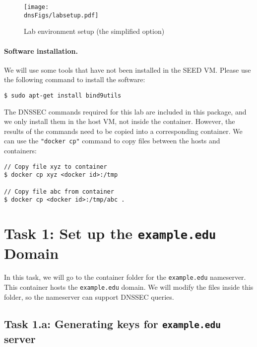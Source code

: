 \begin{figure}[htb]
\begin{center}
\texttt{[image: \\dnsFigs/labsetup.pdf]}
\end{center}
\caption{Lab environment setup (the simplified option)}
\label{dnssec:fig:labsetup-simple}
\end{figure}



\paragraph{Software installation.} We will use some tools that 
have not been installed in the SEED VM. Please use the following
command to install the software: 

\begin{lstlisting}
$ sudo apt-get install bind9utils
\end{lstlisting}
 
The DNSSEC commands required for this lab are included in this package, 
and we only install them in the host VM, not inside the container. 
However, the results of the commands need to be copied into
a corresponding container. 
We can use the \texttt{"docker cp"}
command to copy files between the hosts and containers: 

\begin{lstlisting}
// Copy file xyz to container
$ docker cp xyz <docker id>:/tmp

// Copy file abc from container
$ docker cp <docker id>:/tmp/abc . 
\end{lstlisting}


\section{Task 1: Set up the \texttt{example.edu} Domain}


In this task, we will go to the container folder for the 
\texttt{example.edu} nameserver. This container
hosts the \texttt{example.edu} domain. 
We will modify the files inside this folder, so the nameserver
can support DNSSEC queries. 



\subsection{Task 1.a: Generating keys for \texttt{example.edu} server} 

